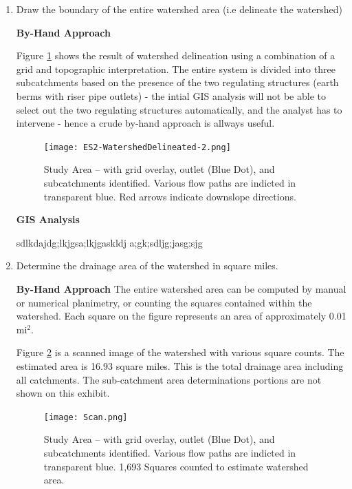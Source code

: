 \documentclass[12pt]{article}
\begin{document}
\begin{enumerate}
\clearpage

\item Draw the boundary of the entire watershed area (i.e delineate the watershed)

\textbf{By-Hand Approach}

Figure \ref{fig:ES2-WatershedDelineated-2} shows the result of watershed delineation using a combination of a grid and topographic interpretation.   The entire system is divided into three subcatchments based on the presence of the two regulating structures (earth berms with riser pipe outlets) - the intial GIS analysis will not be able to select out the two regulating structures automatically, and the analyst has to intervene - hence a crude by-hand approach is allways useful. 

\begin{figure}[h!] %
   \centering
   \texttt{[image: ES2-WatershedDelineated-2.png]} 
   \caption{Study Area -- with grid overlay, outlet (Blue Dot), and subcatchments identified.  Various flow paths are indicted in transparent blue.  Red arrows indicate downslope directions.}
   \label{fig:ES2-WatershedDelineated-2}
\end{figure}

\clearpage

\textbf{GIS Analysis}

sdlkdajdg;lkjgsa;lkjgaskldj
a;gk;sdljg;jasg;sjg

\clearpage

\item Determine the drainage area of the watershed in square miles.

\textbf{By-Hand Approach}
The entire watershed area can be computed by manual or numerical planimetry, or counting the squares contained within the watershed.   Each square on the figure represents an area of approximately 0.01 mi$^2$.

Figure \ref{fig:ES2-WatershedArea-2} is a scanned image of the watershed with various square counts.  The estimated area is 16.93 square miles.   This is the total drainage area including all catchments.  The sub-catchment area determinations portions are not shown on this exhibit.  

\begin{figure}[h!] %
   \centering
   \texttt{[image: Scan.png]} 
   \caption{Study Area -- with grid overlay, outlet (Blue Dot), and subcatchments identified.  Various flow paths are indicted in transparent blue.  1,693 Squares counted to estimate watershed area.}
   \label{fig:ES2-WatershedArea-2}
\end{figure}



\end{enumerate}
\end{document}
